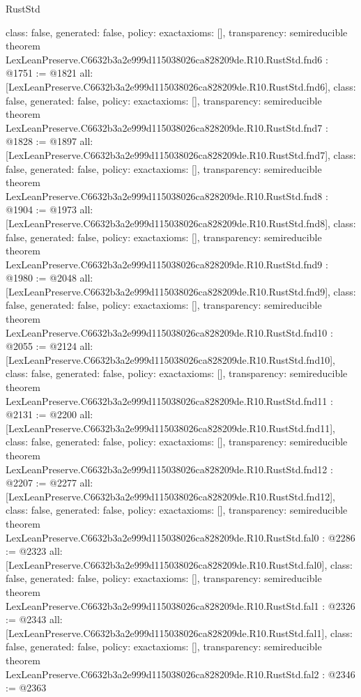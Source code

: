 \begin{lexlean}{RustStd}
\begin{coremodule}
{  class: false,
  generated: false,
  policy: exact{axioms: []},
  transparency: semireducible
}
theorem LexLeanPreserve.C6632b3a2e999d115038026ca828209de.R10.RustStd.fnd6 : @1751 := @1821 {
  all: [LexLeanPreserve.C6632b3a2e999d115038026ca828209de.R10.RustStd.fnd6],
  class: false,
  generated: false,
  policy: exact{axioms: []},
  transparency: semireducible
}
theorem LexLeanPreserve.C6632b3a2e999d115038026ca828209de.R10.RustStd.fnd7 : @1828 := @1897 {
  all: [LexLeanPreserve.C6632b3a2e999d115038026ca828209de.R10.RustStd.fnd7],
  class: false,
  generated: false,
  policy: exact{axioms: []},
  transparency: semireducible
}
theorem LexLeanPreserve.C6632b3a2e999d115038026ca828209de.R10.RustStd.fnd8 : @1904 := @1973 {
  all: [LexLeanPreserve.C6632b3a2e999d115038026ca828209de.R10.RustStd.fnd8],
  class: false,
  generated: false,
  policy: exact{axioms: []},
  transparency: semireducible
}
theorem LexLeanPreserve.C6632b3a2e999d115038026ca828209de.R10.RustStd.fnd9 : @1980 := @2048 {
  all: [LexLeanPreserve.C6632b3a2e999d115038026ca828209de.R10.RustStd.fnd9],
  class: false,
  generated: false,
  policy: exact{axioms: []},
  transparency: semireducible
}
theorem LexLeanPreserve.C6632b3a2e999d115038026ca828209de.R10.RustStd.fnd10 : @2055 := @2124 {
  all: [LexLeanPreserve.C6632b3a2e999d115038026ca828209de.R10.RustStd.fnd10],
  class: false,
  generated: false,
  policy: exact{axioms: []},
  transparency: semireducible
}
theorem LexLeanPreserve.C6632b3a2e999d115038026ca828209de.R10.RustStd.fnd11 : @2131 := @2200 {
  all: [LexLeanPreserve.C6632b3a2e999d115038026ca828209de.R10.RustStd.fnd11],
  class: false,
  generated: false,
  policy: exact{axioms: []},
  transparency: semireducible
}
theorem LexLeanPreserve.C6632b3a2e999d115038026ca828209de.R10.RustStd.fnd12 : @2207 := @2277 {
  all: [LexLeanPreserve.C6632b3a2e999d115038026ca828209de.R10.RustStd.fnd12],
  class: false,
  generated: false,
  policy: exact{axioms: []},
  transparency: semireducible
}
theorem LexLeanPreserve.C6632b3a2e999d115038026ca828209de.R10.RustStd.fal0 : @2286 := @2323 {
  all: [LexLeanPreserve.C6632b3a2e999d115038026ca828209de.R10.RustStd.fal0],
  class: false,
  generated: false,
  policy: exact{axioms: []},
  transparency: semireducible
}
theorem LexLeanPreserve.C6632b3a2e999d115038026ca828209de.R10.RustStd.fal1 : @2326 := @2343 {
  all: [LexLeanPreserve.C6632b3a2e999d115038026ca828209de.R10.RustStd.fal1],
  class: false,
  generated: false,
  policy: exact{axioms: []},
  transparency: semireducible
}
theorem LexLeanPreserve.C6632b3a2e999d115038026ca828209de.R10.RustStd.fal2 : @2346 := @2363 {
}
\end{coremodule}
\end{lexlean}
